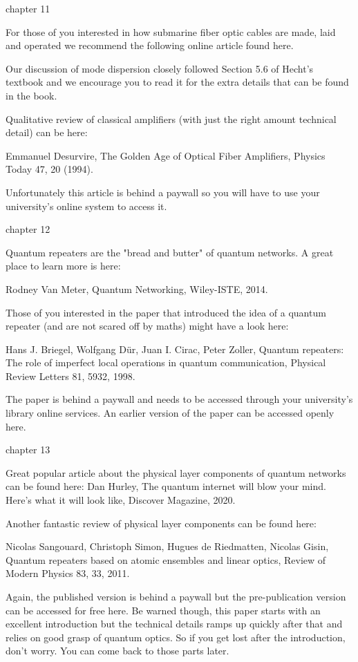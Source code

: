 chapter 11

For those of you interested in how submarine fiber optic cables are made, laid and operated we recommend the following online article found here.

Our discussion of mode dispersion closely followed Section 5.6 of Hecht’s textbook and we encourage you to read it for the extra details that can be found in the book.

Qualitative review of classical amplifiers (with just the right amount technical detail) can be here:

Emmanuel Desurvire, The Golden Age of Optical Fiber Amplifiers, Physics Today 47, 20 (1994).

Unfortunately this article is behind a paywall so you will have to use your university’s online system to access it.

chapter 12

Quantum repeaters are the "bread and butter" of quantum networks. A great place to learn more is here:

Rodney Van Meter, Quantum Networking, Wiley-ISTE, 2014.

Those of you interested in the paper that introduced the idea of a quantum repeater (and are not scared off by maths) might have a look here:

Hans J. Briegel, Wolfgang Dür, Juan I. Cirac, Peter Zoller, Quantum repeaters: The role of imperfect local operations in quantum communication, Physical Review Letters 81, 5932, 1998.

The paper is behind a paywall and needs to be accessed through your university’s library online services. An earlier version of the paper can be accessed openly here.

chapter 13

Great popular article about the physical layer components of quantum networks can be found here:
Dan Hurley, The quantum internet will blow your mind. Here’s what it will look like, Discover Magazine, 2020.

Another fantastic review of physical layer components can be found here:

Nicolas Sangouard, Christoph Simon, Hugues de Riedmatten, Nicolas Gisin, Quantum repeaters based on atomic ensembles and linear optics, Review of Modern Physics 83, 33, 2011.

Again, the published version is behind a paywall but the pre-publication version can be accessed for free here. Be warned though, this paper starts with an excellent introduction but the technical details ramps up quickly after that and relies on good grasp of quantum optics. So if you get lost after the introduction, don’t worry. You can come back to those parts later.
